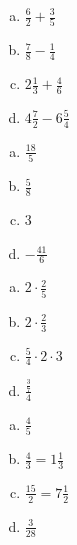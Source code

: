 \begin{tehtavasivu}
        \begin{tehtava}
        
        \begin{enumerate}[a)]
        	\item $\frac{6}{2} + \frac{3}{5}$
        	\item $\frac{7}{8} - \frac{1}{4}$
        	\item $2 \frac{1}{3} + \frac{4}{6}$
        	\item $4 \frac{7}{2} - 6 \frac{5}{4}$
        \end{enumerate}
            \begin{vastaus}		
        		\begin{enumerate}[a)]
        			\item $\frac{18}{5}$
        			\item $\frac{5}{8}$
        			\item $3$
        			\item $-\frac{41}{6}$ 
        		\end{enumerate}
            \end{vastaus}
        \end{tehtava}
        
        \begin{tehtava}
        
        \begin{enumerate}[a)]
        	\item $2 \cdot \frac{2}{5}$
        	\item $2 \cdot \frac{2}{3}$
        	\item $\frac{5}{4} \cdot 2 \cdot 3$
        	\item $\frac{\frac{3}{7}}{4}$ 
        \end{enumerate}
            \begin{vastaus}
        		\begin{enumerate}[a)]
        			\item $\frac{4}{5}$
        			\item $\frac{4}{3} = 1 \frac{1}{3}$
        			\item $\frac{15}{2} = 7 \frac{1}{2}$
        			\item $\frac{3}{28}$
        		\end{enumerate}
            \end{vastaus}
        \end{tehtava}
        
        \begin{tehtava}
        

\end{tehtava}
\end{tehtavasivu}
